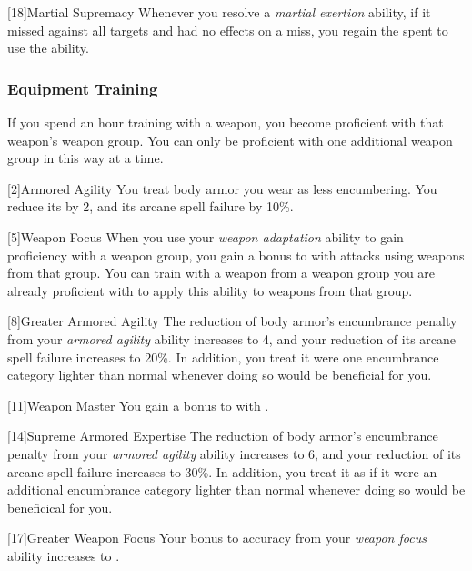             [18]{Martial Supremacy}
            Whenever you resolve a \textit{martial exertion} ability, if it missed against all targets and had no effects on a miss, you regain the  spent to use the ability.

        \subsubsection{Equipment Training}
            If you spend an hour training with a weapon, you become proficient with that weapon's weapon group.
            You can only be proficient with one additional weapon group in this way at a time.

            [2]{Armored Agility}
            You treat body armor you wear as less encumbering.
            You reduce its  by 2, and its arcane spell failure by 10\%.

            [5]{Weapon Focus} 
            When you use your \textit{weapon adaptation} ability to gain proficiency with a weapon group, you gain a  bonus to  with attacks using weapons from that group.
            You can train with a weapon from a weapon group you are already proficient with to apply this ability to weapons from that group.

            [8]{Greater Armored Agility}
            The reduction of body armor's encumbrance penalty from your \textit{armored agility} ability increases to 4, and your reduction of its arcane spell failure increases to 20\%.
            In addition, you treat it were one encumbrance category lighter than normal whenever doing so would be beneficial for you.

            [11]{Weapon Master} 
            You gain a  bonus to  with .

            [14]{Supreme Armored Expertise}
            The reduction of body armor's encumbrance penalty from your \textit{armored agility} ability increases to 6, and your reduction of its arcane spell failure increases to 30\%.
            In addition, you treat it as if it were an additional encumbrance category lighter than normal whenever doing so would be beneficical for you.

            [17]{Greater Weapon Focus} 
            Your bonus to accuracy from your \textit{weapon focus} ability increases to .

